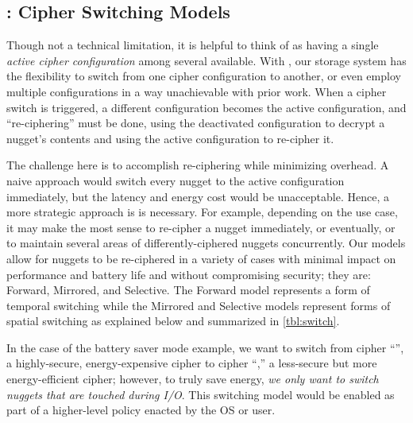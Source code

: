 \subsection{\sysA: Cipher Switching Models}\label{subsec:des-switch}

Though not a technical limitation, it is helpful to think of \sys as having a
single {\em active cipher configuration} among several available. With \sysA,
our storage system has the flexibility to switch from one cipher configuration
to another, or even employ multiple configurations in a way unachievable with
prior work. When a cipher switch is triggered, a different configuration becomes
the active configuration, and ``re-ciphering'' must be done, \ie using the
deactivated configuration to decrypt a nugget's contents and using the active
configuration to re-cipher it.

The challenge here is to accomplish re-ciphering while minimizing overhead. A
naive approach would switch every nugget to the active configuration
immediately, but the latency and energy cost would be unacceptable. Hence, a
more strategic approach is is necessary. For example, depending on the use case,
it may make the most sense to re-cipher a nugget immediately, or eventually, or
to maintain several areas of differently-ciphered nuggets concurrently. Our
models allow for nuggets to be re-ciphered in a variety of cases with minimal
impact on performance and battery life and without compromising security; they
are: Forward, Mirrored, and Selective. The Forward model represents a form of
temporal switching while the Mirrored and Selective models represent forms of
spatial switching as explained below and summarized in \cref{tbl:switch}.




 In the case of the battery saver mode example, we
want to switch from cipher ``\cone'', a highly-secure, energy-expensive cipher
to cipher ``\ctwo,'' a less-secure but more energy-efficient cipher; however, to
truly save energy, {\em we only want to switch nuggets that are touched during
I/O}. This switching model would be enabled as part of a higher-level policy
enacted by the OS or user.

